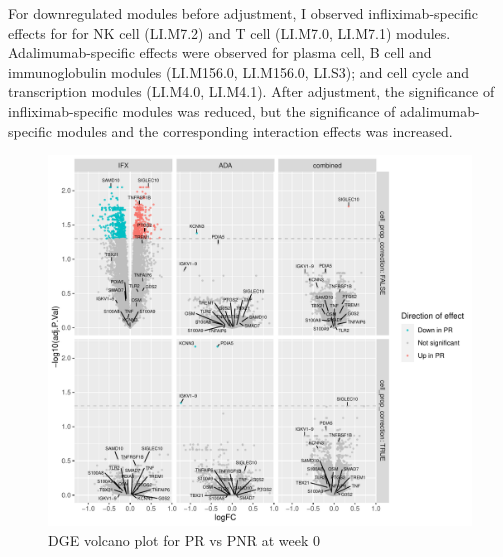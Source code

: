 \begin{outline}
For downregulated modules before adjustment, I observed infliximab-specific effects for for NK cell (LI.M7.2) and T cell (LI.M7.0, LI.M7.1) modules.
Adalimumab-specific effects were observed for plasma cell, B cell and immunoglobulin modules (LI.M156.0, LI.M156.0, LI.S3); and cell cycle and transcription modules (LI.M4.0, LI.M4.1).
After adjustment, the significance of infliximab-specific modules was reduced, 
but the significance of adalimumab-specific modules and the corresponding interaction effects was increased.

\begin{figure}
    \centering
    \includegraphics[width=1.0\textwidth,page=1]{mainmatter/figures/chapter_04/plot_gene_set_enrichment.dge_result_volcano_simple_C_1RI_1NI,C_1RA_1NA,C_1R_1N.pdf}
    \caption{DGE volcano plot for PR vs PNR at week 0}
    \label{fig:multipants_dge_volcano_week_0_R_N}
\end{figure}



\end{outline}
